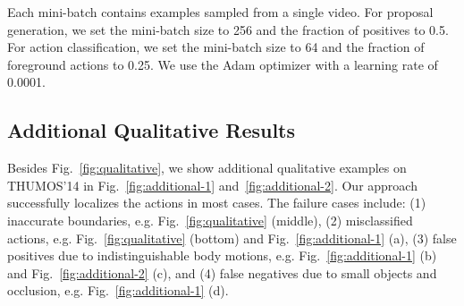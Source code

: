 \documentclass[10pt,twocolumn,letterpaper]{article}
\begin{document}
Each mini-batch contains examples sampled from a single video. For proposal
generation, we set the mini-batch size to 256 and the fraction of positives to
0.5. For action classification, we set the mini-batch size to 64 and the
fraction of foreground actions to 0.25. We use the Adam optimizer with a
learning rate of 0.0001.

\subsection{Additional Qualitative Results}

Besides Fig.~\ref{fig:qualitative}, we show additional qualitative examples on
THUMOS'14 in Fig.~\ref{fig:additional-1} and~\ref{fig:additional-2}. Our
approach successfully localizes the actions in most cases. The failure cases
include: (1) inaccurate boundaries, e.g. Fig.~\ref{fig:qualitative} (middle),
(2) misclassified actions, e.g. Fig.~\ref{fig:qualitative} (bottom) and Fig.~\ref{fig:additional-1} (a), (3) false positives due to indistinguishable
body motions, e.g. Fig.~\ref{fig:additional-1} (b) and Fig.~\ref{fig:additional-2} (c), and (4) false negatives due to small objects and occlusion, e.g. Fig.~\ref{fig:additional-1} (d).
\end{document}
